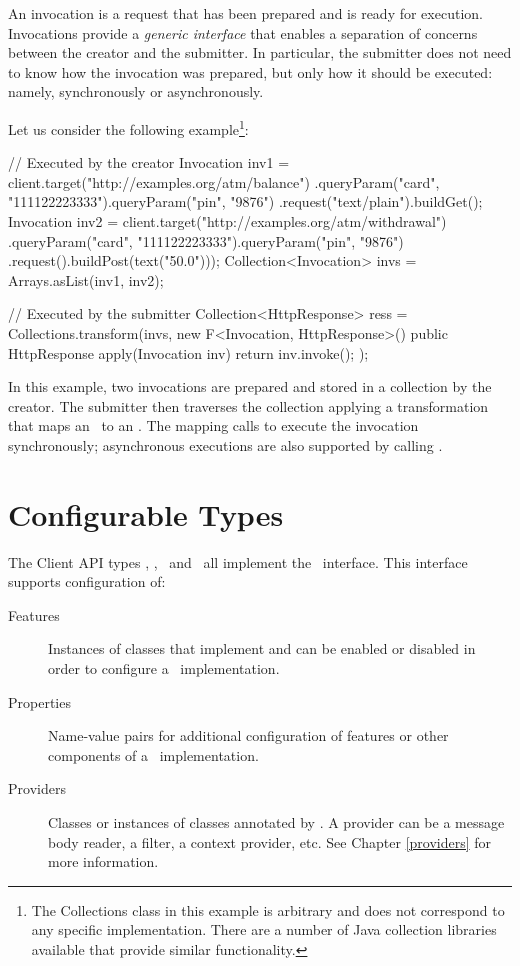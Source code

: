 An invocation is a request that has been prepared and is ready for execution. Invocations provide a {\em generic interface} that enables a separation of concerns between the creator and the submitter. In particular, the submitter does not need to know how the invocation was prepared, but only how it should be executed: namely, synchronously or asynchronously.

 Let us consider the following example\footnote{The Collections class in this example is arbitrary and does not correspond to any specific implementation. There are a number of Java collection libraries available that provide similar functionality.}:

\begin{listing}{1}
// Executed by the creator
Invocation inv1 = client.target("http://examples.org/atm/balance")
    .queryParam("card", "111122223333").queryParam("pin", "9876")
    .request("text/plain").buildGet();
Invocation inv2 = client.target("http://examples.org/atm/withdrawal")
    .queryParam("card", "111122223333").queryParam("pin", "9876")
    .request().buildPost(text("50.0")));
Collection<Invocation> invs = Arrays.asList(inv1, inv2);

// Executed by the submitter
Collection<HttpResponse> ress =
    Collections.transform(invs,
        new F<Invocation, HttpResponse>() {
             public HttpResponse apply(Invocation inv) {
                 return inv.invoke(); } });
\end{listing}

In this example, two invocations are prepared and stored in a collection by the creator. The submitter then traverses the collection applying a transformation that maps an \Invocation\ to an \HttpResponse. The mapping calls  to execute the invocation synchronously; asynchronous executions are also supported by calling .

\section{Configurable Types}
\label{configurable_types}

The Client API types \Client, \Invocation, \InvocationBuilder\ and \Target\ all implement the \Configurable\ interface. This interface supports configuration of:

\begin{description}
\item [Features] Instances of classes that implement  and can be enabled or disabled in order to configure a \jaxrs\ implementation.
\item [Properties] Name-value pairs for additional configuration of features or other components of a \jaxrs\ implementation.
\item [Providers] Classes or instances of classes annotated by \Provider. A provider can be a message body reader, a filter, a context provider, etc. See Chapter \ref{providers} for more information.
\end{description}

